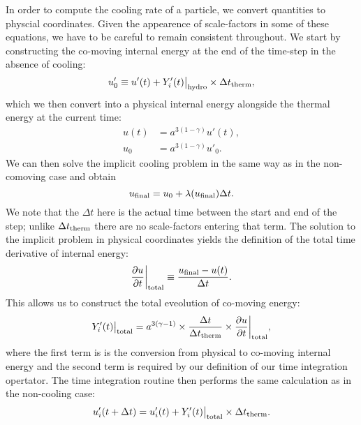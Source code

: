 \documentclass[fleqn, usenatbib, useAMS, a4paper]{mnras}
\begin{document}
In order to compute the
cooling rate of a particle, we convert quantities to physcial
coordinates. Given the appearence of scale-factors in some of these
equations, we have to be careful to remain consistent throughout. We
start by constructing the co-moving internal energy at the end of the
time-step in the absence of cooling:
\begin{equation}
  u'_0 \equiv u'(t) + Y'_i(t)\big|_{\rm hydro} \times \Delta t_{\rm therm},
\end{equation}
which we then convert into a physical internal energy alongside the
thermal energy at the current time:
\begin{align}
  u(t) &= a^{3(1-\gamma)}u'(t),\\
  u_0 &= a^{3(1-\gamma)}u'_0.
\end{align}
We can then solve the implicit cooling problem in the same way as in
the non-comoving case and obtain
\begin{equation}
  u_{\rm final} = u_0 + \lambda(u_{\rm final}) \Delta t.
\end{equation}
We note that the $\Delta t$ here is the actual time between the start
and end of the step; unlike $\Delta t_{\rm therm}$ there are no
scale-factors entering that term. The solution to the implicit problem
in physical coordinates yields the definition of the total time
derivative of internal energy:
\begin{equation}
  \frac{\partial u}{\partial t}\bigg|_{\rm total} \equiv \frac{u_{\rm final} -
    u(t)}{\Delta t}.
\end{equation}
This allows us to construct the total eveolution of co-moving energy:
\begin{equation}
  Y'_i(t)\big|_{\rm total} = a^{3(\gamma-1)} \times \frac{\Delta t}{\Delta
    t_{\rm therm}} \times
  \frac{\partial u}{\partial t}\bigg|_{\rm total},
\end{equation}
where the first term is is the conversion from physical to co-moving
internal energy and the second term is required by our definition of
our time integration opertator. The time integration routine then performs the
same calculation as in the non-cooling case:
\begin{equation}
  u'_i(t+\Delta t) = u'_i(t) + Y'_i(t)\big|_{\rm total} \times {\Delta t_{\rm therm}}.
\end{equation}



\end{document}
